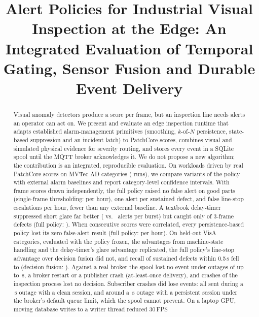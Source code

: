 \documentclass[conference]{IEEEtran}
\begin{document}
\title{Alert Policies for Industrial Visual Inspection at the Edge: An Integrated Evaluation of Temporal Gating, Sensor Fusion and Durable Event Delivery}

\author{
}

\maketitle

\begin{abstract}
Visual anomaly detectors produce a score per frame, but an inspection line needs alerts an operator can act on. We present and evaluate an edge inspection runtime that adapts established alarm-management primitives (smoothing, $k$-of-$N$ persistence, state-based suppression and an incident latch) to PatchCore scores, combines visual and simulated physical evidence for severity routing, and stores every event in a SQLite spool until the MQTT broker acknowledges it. We do not propose a new algorithm; the contribution is an integrated, reproducible evaluation. On \NumWorkloads{} workloads driven by real PatchCore scores on \NumCategories{} MVTec AD categories (\TotalRuns{} runs), we compare \NumVariants{} variants of the policy with \NumExternal{} external alarm baselines and report category-level confidence intervals. With frame scores drawn independently, the full policy raised no false alert on good parts (single-frame thresholding: \NominalFABaseline{} per hour), one alert per sustained defect, and \CritFAFull{} false line-stop escalations per hour, fewer than any external baseline. A textbook delay-timer suppressed short glare far better (\GlarePerBurstTimer{} vs.\ \GlarePerBurstFull{} alerts per burst) but caught only \ShortRecallTimerThree{} of 3-frame defects (full policy: \ShortRecallFullThree{}). When consecutive scores were correlated, every persistence-based policy lost its zero false-alert result (full policy: \RhoNominalFAFull{} per hour). On \VisaNumCategories{} held-out VisA categories, evaluated with the policy frozen, the advantages from machine-state handling and the delay-timer's glare advantage replicated, the full policy's line-stop advantage over decision fusion did not, and recall of sustained defects within 0.5\,s fell to \VisaDefectRecallFull{} (decision fusion: \VisaDefectRecallFusion{}). Against a real broker the spool lost no event under outages of up to \SpoolMaxOutage{}\,s, a broker restart or a publisher crash (at-least-once delivery), and \CrashWriterKills{} crashes of the inspection process lost no decision. Subscriber crashes did lose events: all \SubCleanWhileDown{} sent during a \SubCleanDown{}\,s outage with a clean session, and \SubPersistLongDefaultMissing{} around a \SubPersistLongDefaultDown{}\,s outage with a persistent session under the broker's default queue limit, which the spool cannot prevent. On a laptop GPU, moving database writes to a writer thread reduced 30\,FPS 
\end{abstract}
\end{document}
